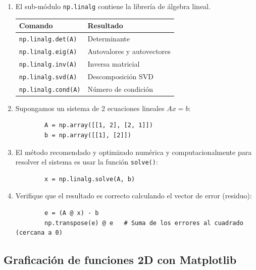 \documentclass[11pt,a4paper,openany]{book}
\begin{document}
\begin{enumerate}
	\item El sub-módulo \texttt{np.linalg} contiene la librería de álgebra lineal. 
	\begin{center}
		\begin{tabular}{ll}
			\textbf{Comando} & \textbf{Resultado} \\ \hline
			\texttt{np.linalg.det(A)} & Determinante \\
			\texttt{np.linalg.eig(A)} & Autovalores y autovectores \\
			\texttt{np.linalg.inv(A)} & Inversa matricial \\
			\texttt{np.linalg.svd(A)} & Descomposición SVD \\
			\texttt{np.linalg.cond(A)} & Número de condición \\
		\end{tabular}
	\end{center}
	
	\item Supongamos un sistema de 2 ecuaciones lineales $Ax=b$:
	\begin{verbatim}
		A = np.array([[1, 2], [2, 1]])
		b = np.array([[1], [2]])
	\end{verbatim}
	
	\item El método recomendado y optimizado numérica y computacionalmente para resolver el sistema es usar la función \texttt{solve()}:
	\begin{verbatim}
		x = np.linalg.solve(A, b)
	\end{verbatim}
	
	\item Verifique que el resultado es correcto calculando el vector de error (residuo):
	\begin{verbatim}
		e = (A @ x) - b
		np.transpose(e) @ e   # Suma de los errores al cuadrado (cercana a 0)
	\end{verbatim}
\end{enumerate}

\subsection{Graficación de funciones 2D con Matplotlib}
\end{document}
